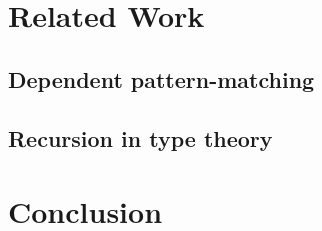 \section{Related Work}

\subsection{Dependent pattern-matching}
\cite{coquand92baastad}
\cite{CornesPhD,DBLP:conf/types/CornesT95}
\cite{DBLP:conf/birthday/GoguenMM06,mcbride:concon,DBLP:journals/jfp/McBrideM04,DBLP:conf/types/BradyMM03}
\cite{norell:thesis}
\cite{sozeau.thesis}

\subsection{Recursion in type theory}
\cite{journals/mscs/BoveC05}
\cite{Barthe:2006gp}

\section{Conclusion}